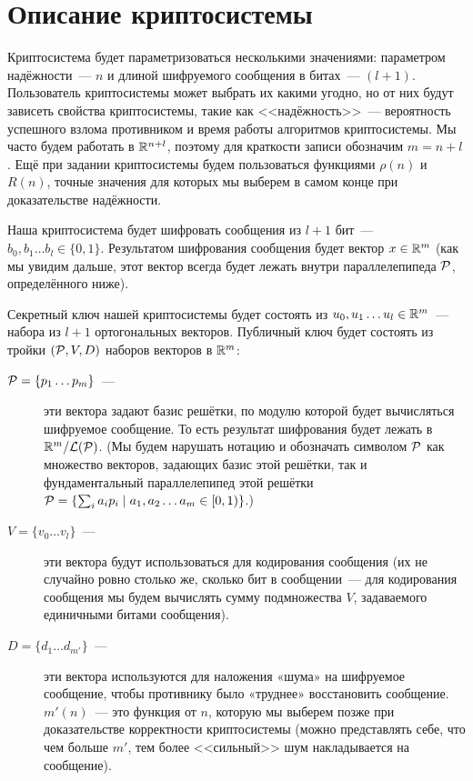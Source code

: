 \documentclass[oneside, a4paper]{article}
\theoremstyle{plain}
\theoremstyle{definition}
\theoremstyle{remark}
\newcommand\PP{\ensuremath \mathcal P}
\newcommand\LL{\ensuremath \mathcal L}
\newcommand\R{\ensuremath \mathbb R}
\begin{document}
\section{Описание криптосистемы}

Криптосистема будет параметризоваться несколькими значениями: параметром надёжности~--- $n$ и длиной шифруемого сообщения
в битах~--- $(l+1)$. Пользователь криптосистемы может выбрать их какими угодно, но от них будут зависеть свойства
криптосистемы, такие как <<надёжность>>~--- вероятность успешного взлома противником и время работы алгоритмов
криптосистемы. Мы часто будем работать в $\R^{n+l}$, поэтому для краткости записи обозначим $m = n + l$. Ещё при задании
криптосистемы будем пользоваться функциями $\rho(n)$ и $R(n)$, точные значения для которых мы выберем в самом конце при
доказательстве надёжности.

Наша криптосистема будет шифровать сообщения из $l+1$ бит~--- $b_0, b_1 \dots b_l \in \{0,1\}$. Результатом шифрования
сообщения будет вектор $x \in \R^m$ (как мы увидим дальше, этот вектор всегда будет лежать внутри параллелепипеда
$\PP$, определённого ниже).

Секретный ключ нашей криптосистемы будет состоять из $u_0, u_1 \dots u_l \in \R^m$~--- набора из $l+1$ ортогональных
векторов. Публичный ключ будет состоять из тройки $(\PP, V, D)$ наборов векторов в $\R^m$:
\begin{description}
\item[$\PP = \{p_1 \dots p_m\}$~---] эти вектора задают базис решётки, по модулю которой будет вычисляться шифруемое
сообщение. То есть результат шифрования будет лежать в $\R^m/\LL(\PP)$. (Мы будем нарушать нотацию и обозначать символом
$\PP$ как множество векторов, задающих базис этой решётки, так и фундаментальный параллелепипед этой решётки $\PP =
\left \{\sum_i a_i p_i \mid a_1, a_2 \dots a_m \in [0, 1) \right\}$.)
\item[$V = \{v_0 \dots v_l\}$~---] эти вектора будут использоваться для кодирования сообщения (их не случайно ровно
столько же, сколько бит в сообщении~--- для кодирования сообщения мы будем вычислять сумму подмножества $V$,
задаваемого единичными битами сообщения).
\item[$D = \{d_1 \dots d_{m'}\}$~---] эти вектора используются для наложения «шума» на шифруемое сообщение, чтобы
противнику было «труднее» восстановить сообщение. $m'(n)$~--- это функция от $n$, которую мы выберем позже при
доказательстве корректности криптосистемы (можно представлять себе, что чем больше $m'$, тем более <<сильный>> шум
накладывается на сообщение).
\end{description}
\end{document}
